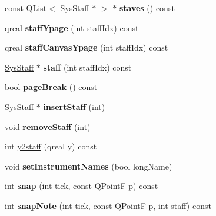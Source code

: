 \begin{DoxyCompactItemize}
\mbox{\label{class_ms_1_1_system_a2bf137e82cdfc11a41e1edd6b25239fd}} 
const Q\+List$<$ \hyperlink{class_ms_1_1_sys_staff}{Sys\+Staff} $\ast$ $>$ $\ast$ {\bfseries staves} () const
\item 
\mbox{\label{class_ms_1_1_system_ad93df8d8b2f2fb6d8d88c1d4b590156c}} 
qreal {\bfseries staff\+Ypage} (int staff\+Idx) const
\item 
\mbox{\label{class_ms_1_1_system_a57ae7602a440ece25a56b8c99530c728}} 
qreal {\bfseries staff\+Canvas\+Ypage} (int staff\+Idx) const
\item 
\mbox{\label{class_ms_1_1_system_a51fa420463d9aadfbdc0839fb781ff1e}} 
\hyperlink{class_ms_1_1_sys_staff}{Sys\+Staff} $\ast$ {\bfseries staff} (int staff\+Idx) const
\item 
\mbox{\label{class_ms_1_1_system_a305159e56ec987a9d01152eca69c3e30}} 
bool {\bfseries page\+Break} () const
\item 
\mbox{\label{class_ms_1_1_system_a779cb818da1550f691e8b67d52175691}} 
\hyperlink{class_ms_1_1_sys_staff}{Sys\+Staff} $\ast$ {\bfseries insert\+Staff} (int)
\item 
\mbox{\label{class_ms_1_1_system_ae399ddd3958386cb6084ba566bb04b01}} 
void {\bfseries remove\+Staff} (int)
\item 
int \hyperlink{class_ms_1_1_system_a5a4b6ab1eb96f43699c734b1c414cecd}{y2staff} (qreal y) const
\item 
\mbox{\label{class_ms_1_1_system_a8b5532c062c5f8ca769a03e47b611838}} 
void {\bfseries set\+Instrument\+Names} (bool long\+Name)
\item 
\mbox{\label{class_ms_1_1_system_a2bb3aed2a5a70db6fa56126069bcb90d}} 
int {\bfseries snap} (int tick, const Q\+PointF p) const
\item 
\mbox{\label{class_ms_1_1_system_ae37e2cf532f03429cbf95fdffff90579}} 
int {\bfseries snap\+Note} (int tick, const Q\+PointF p, int staff) const

\end{DoxyCompactItemize}
